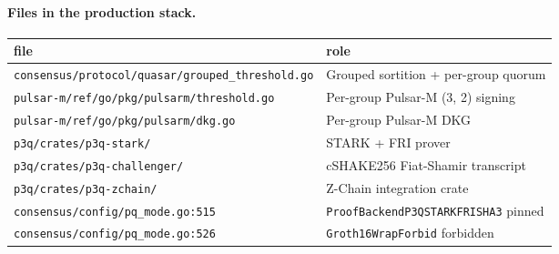 \paragraph{Files in the production stack.}
\begin{center}\small
\begin{tabular}{l l}
\toprule
file & role \\
\midrule
\texttt{consensus/protocol/quasar/grouped\_threshold.go} & Grouped sortition + per-group quorum \\
\texttt{pulsar-m/ref/go/pkg/pulsarm/threshold.go} & Per-group Pulsar-M (3, 2) signing \\
\texttt{pulsar-m/ref/go/pkg/pulsarm/dkg.go} & Per-group Pulsar-M DKG \\
\texttt{p3q/crates/p3q-stark/} & STARK + FRI prover \\
\texttt{p3q/crates/p3q-challenger/} & cSHAKE256 Fiat-Shamir transcript \\
\texttt{p3q/crates/p3q-zchain/} & Z-Chain integration crate \\
\texttt{consensus/config/pq\_mode.go:515} & \texttt{ProofBackendP3QSTARKFRISHA3} pinned \\
\texttt{consensus/config/pq\_mode.go:526} & \texttt{Groth16WrapForbid} forbidden \\
\bottomrule
\end{tabular}
\end{center}
